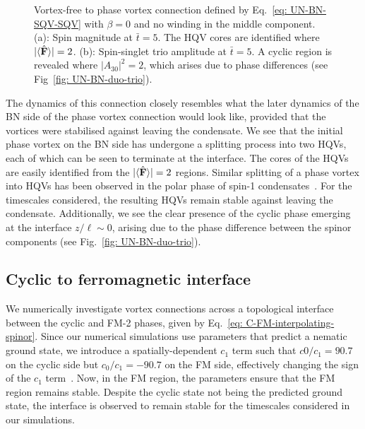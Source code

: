 \begin{figure}
\begin{subfigure}{0.45\textwidth}
        \caption{}
    \end{subfigure}
    \caption[Dynamics of a singly quantised vortex to vortex-free connection in
    a uniaxial nematic to biaxial nematic interface]
    {\label{fig: UN-BN-VF-SQV} Vortex-free to phase vortex connection defined
    by Eq.~\eqref{eq: UN-BN-SQV-SQV} with \(\beta=0\) and no winding in the
    middle component.
    (a): Spin magnitude at \(\bar{t}=5\). The HQV cores are identified where
    \(|\langle \hat{\vb{F}} \rangle | = 2\).
    (b): Spin-singlet trio amplitude at \(\bar{t} = 5\). A cyclic region is
    revealed where \(|A_{30}|^2 = 2\), which arises due to phase differences
    (see Fig~\ref{fig: UN-BN-duo-trio}).}
\end{figure}
The dynamics of this connection closely resembles what the later dynamics of the
BN side of the phase vortex connection would look like, provided that the
vortices were stabilised against leaving the condensate.
We see that the initial phase vortex on the BN side has undergone a splitting
process into two HQVs, each of which can be seen to terminate at the interface.
The cores of the HQVs are easily identified from the
\(|\langle \hat{\vb{F}} \rangle | = 2\) regions.
Similar splitting of a phase vortex into HQVs has been observed in the polar
phase of spin-1 condensates~\cite{Seo2015, Xiao2021}.
For the timescales considered, the resulting HQVs remain stable against
leaving the condensate.
Additionally, we see the clear presence of the cyclic phase emerging at the
interface \(z / \ell \sim 0\), arising due to the phase difference between
the spinor components (see Fig.~\ref{fig: UN-BN-duo-trio}).

\subsection{Cyclic to ferromagnetic interface}
We numerically investigate vortex connections across a topological interface
between the cyclic and FM-2 phases, given by
Eq.~\eqref{eq: C-FM-interpolating-spinor}.
Since our numerical simulations use parameters that predict a nematic ground
state, we introduce a spatially-dependent \(c_1\) term such that \(c0/c_1=90.7\)
on the cyclic side but \(c_0/c_1=-90.7\) on the FM side, effectively changing
the sign of the \(c_1\) term~\cite{Fatemi2000,Papoular2010}.
Now, in the FM region, the parameters ensure that the FM region remains stable.
Despite the cyclic state not being the predicted ground state, the interface
is observed to remain stable for the timescales considered in our simulations.

